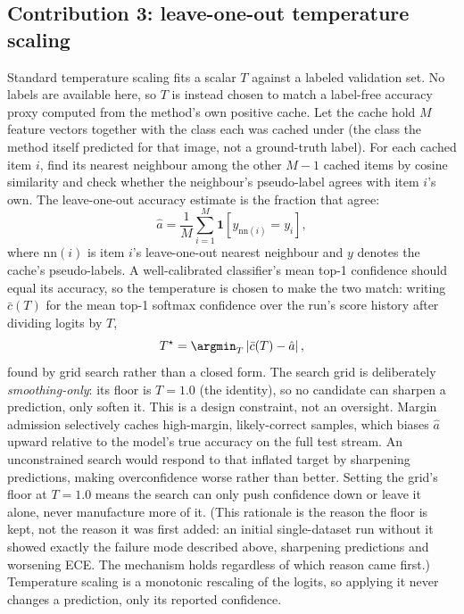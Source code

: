 \subsection{Contribution 3: leave-one-out temperature scaling}

Standard temperature scaling fits a scalar $T$ against a labeled validation set. No labels are
available here, so $T$ is instead chosen to match a label-free accuracy proxy computed from the
method's own positive cache. Let the cache hold $M$ feature vectors together with the class
each was cached under (the class the method itself predicted for that image, not a ground-truth
label). For each cached item $i$, find its nearest neighbour among the other $M-1$ cached items
by cosine similarity and check whether the neighbour's pseudo-label agrees with item $i$'s own.
The leave-one-out accuracy estimate is the fraction that agree:
\begin{equation}
    \hat{a} = \frac{1}{M} \sum_{i=1}^{M} \mathbf{1}\!\left[ y_{\mathrm{nn}(i)} = y_i \right],
\end{equation}
where $\mathrm{nn}(i)$ is item $i$'s leave-one-out nearest neighbour and $y$ denotes the
cache's pseudo-labels. A well-calibrated classifier's mean top-1 confidence should equal its
accuracy, so the temperature is chosen to make the two match: writing $\bar{c}(T)$ for the mean
top-1 softmax confidence over the run's score history after dividing logits by $T$,
\begin{equation}
    T^{\star} = \argmin_{T} \left| \bar{c}(T) - \hat{a} \right|,
\end{equation}
found by grid search rather than a closed form. The search grid is deliberately
\emph{smoothing-only}: its floor is $T = 1.0$ (the identity), so no candidate can sharpen a
prediction, only soften it. This is a design constraint, not an oversight. Margin admission
selectively caches high-margin, likely-correct samples, which biases $\hat{a}$ upward relative
to the model's true accuracy on the full test stream. An unconstrained search would respond to
that inflated target by sharpening predictions, making overconfidence worse rather than better.
Setting the grid's floor at $T = 1.0$ means the search can only push confidence down or
leave it alone,
never manufacture more of it. (This rationale is the reason the floor is kept, not the reason
it was first added: an initial single-dataset run without it showed exactly the failure mode
described above, sharpening predictions and worsening ECE. The mechanism holds
regardless of which reason came first.) Temperature scaling is a
monotonic rescaling of the logits, so applying it never changes a prediction, only its reported
confidence.

